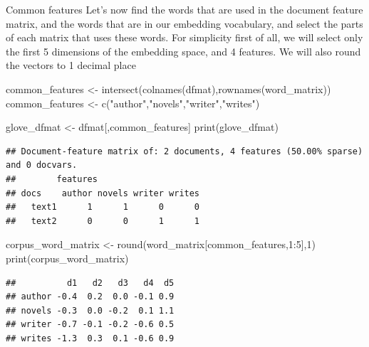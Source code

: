 \documentclass[
  10pt,
  ignorenonframetext,
  aspectratio=169]{beamer}
\newenvironment{Shaded}{\begin{snugshade}}{\end{snugshade}}
\newcommand{\DecValTok}[1]{\textcolor[rgb]{0.86,0.86,0.80}{#1}}
\newcommand{\FunctionTok}[1]{\textcolor[rgb]{0.94,0.94,0.56}{#1}}
\newcommand{\NormalTok}[1]{\textcolor[rgb]{0.80,0.80,0.80}{#1}}
\newcommand{\OtherTok}[1]{\textcolor[rgb]{0.94,0.94,0.56}{#1}}
\newcommand{\SpecialCharTok}[1]{\textcolor[rgb]{0.86,0.64,0.64}{#1}}
\newcommand{\StringTok}[1]{\textcolor[rgb]{0.80,0.58,0.58}{#1}}
\begin{document}
\begin{frame}[fragile]{Common features}
\protect\hypertarget{common-features}{}
Let's now find the words that are used in the document feature matrix,
and the words that are in our embedding vocabulary, and select the parts
of each matrix that uses these words. For simplicity first of all, we
will select only the first 5 dimensions of the embedding space, and 4
features. We will also round the vectors to 1 decimal place

\medskip

\scriptsize

\begin{Shaded}
\begin{Highlighting}[]
\NormalTok{common\_features }\OtherTok{\textless{}{-}} \FunctionTok{intersect}\NormalTok{(}\FunctionTok{colnames}\NormalTok{(dfmat),}\FunctionTok{rownames}\NormalTok{(word\_matrix))}
\NormalTok{common\_features }\OtherTok{\textless{}{-}} \FunctionTok{c}\NormalTok{(}\StringTok{"author"}\NormalTok{,}\StringTok{"novels"}\NormalTok{,}\StringTok{"writer"}\NormalTok{,}\StringTok{"writes"}\NormalTok{)}

\NormalTok{glove\_dfmat }\OtherTok{\textless{}{-}}\NormalTok{ dfmat[,common\_features]}
\FunctionTok{print}\NormalTok{(glove\_dfmat)}
\end{Highlighting}
\end{Shaded}

\begin{verbatim}
## Document-feature matrix of: 2 documents, 4 features (50.00% sparse) and 0 docvars.
##        features
## docs    author novels writer writes
##   text1      1      1      0      0
##   text2      0      0      1      1
\end{verbatim}

\begin{Shaded}
\begin{Highlighting}[]
\NormalTok{corpus\_word\_matrix }\OtherTok{\textless{}{-}} \FunctionTok{round}\NormalTok{(word\_matrix[common\_features,}\DecValTok{1}\SpecialCharTok{:}\DecValTok{5}\NormalTok{],}\DecValTok{1}\NormalTok{)}
\FunctionTok{print}\NormalTok{(corpus\_word\_matrix)}
\end{Highlighting}
\end{Shaded}

\begin{verbatim}
##          d1   d2   d3   d4  d5
## author -0.4  0.2  0.0 -0.1 0.9
## novels -0.3  0.0 -0.2  0.1 1.1
## writer -0.7 -0.1 -0.2 -0.6 0.5
## writes -1.3  0.3  0.1 -0.6 0.9
\end{verbatim}
\end{frame}
\end{document}
